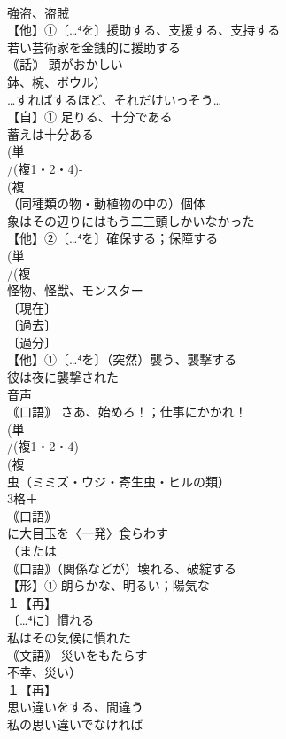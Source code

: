 \documentclass[8pt]{extreport}
\begin{document}
\begin{CJK}{UTF8}{min}
\\	強盗、盗賊
\\	【他】①〔…⁴を〕援助する、支援する、支持する 
\\	若い芸術家を金銭的に援助する
\\	｟話｠ 頭がおかしい 
\\	鉢、椀、ボウル）
\\	…すればするほど、それだけいっそう…
\\	【自】① 足りる、十分である 
\\	蓄えは十分ある
\\	(単
\\	/(複1・2・4)-
\\	(複
\\	（同種類の物・動植物の中の）個体 
\\	象はその辺りにはもう二三頭しかいなかった
\\	【他】②〔…⁴を〕確保する；保障する
\\	(単
\\	/(複
\\	怪物、怪獣、モンスター 
\\	〔現在〕
\\	〔過去〕
\\	〔過分〕
\\	【他】①〔…⁴を〕（突然）襲う、襲撃する 
\\	彼は夜に襲撃された
\\	音声
\\	｟口語｠ さあ、始めろ！；仕事にかかれ！
\\	(単
\\	/(複1・2・4)
\\	(複
\\	虫（ミミズ・ウジ・寄生虫・ヒルの類）
\\	3格＋
\\	｟口語｠ 
\\	に大目玉を〈一発〉食らわす
\\	（または
\\	｟口語｠（関係などが）壊れる、破綻する
\\	【形】① 朗らかな、明るい；陽気な
\\	１【再】
\\	〔…⁴に〕慣れる 
\\	私はその気候に慣れた
\\	｟文語｠ 災いをもたらす 
\\	不幸、災い）
\\	１【再】
\\	思い違いをする、間違う 
\\	私の思い違いでなければ

\end{CJK}
\end{document}
